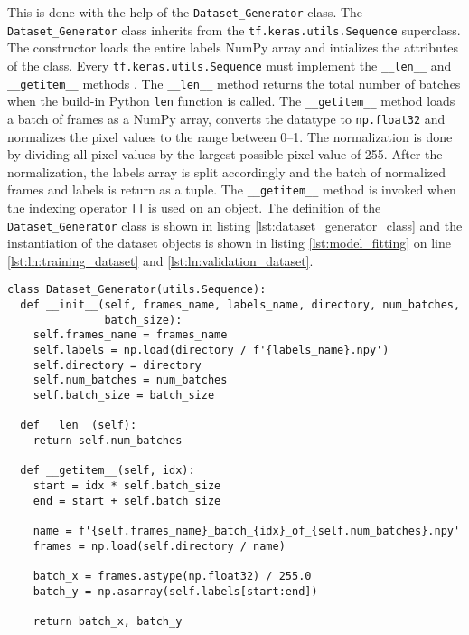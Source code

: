 This is done with the help of the \texttt{Dataset\_Generator} class.
The \texttt{Dataset\_Generator} class inherits from the \texttt{tf.keras.utils.Sequence} superclass.
The constructor loads the entire labels NumPy array and intializes the attributes of the class.
Every \texttt{tf.keras.utils.Sequence} must implement the \texttt{\_\_len\_\_} and \texttt{\_\_getitem\_\_} methods \cite{training_arch_tf_keras_sequence}.
The \texttt{\_\_len\_\_} method returns the total number of batches when the build-in Python \texttt{len} function is called.
The \texttt{\_\_getitem\_\_} method loads a batch of frames as a NumPy array, converts the datatype to \texttt{np.float32} and normalizes the pixel values to the range between \numrange{0}{1}.
The normalization is done by dividing all pixel values by the largest possible pixel value of \num{255}.
After the normalization, the labels array is split accordingly and the batch of normalized frames and labels is return as a tuple.
The \texttt{\_\_getitem\_\_} method is invoked when the indexing operator \texttt{[]} is used on an object.
The definition of the \texttt{Dataset\_Generator} class is shown in listing \ref{lst:dataset_generator_class} and the instantiation of the dataset objects is shown in listing \ref{lst:model_fitting} on line \ref{lst:ln:training_dataset} and \ref{lst:ln:validation_dataset}.

\begin{lstlisting}[style=python, caption={\texttt{Dataset\_Generator} class}, label=lst:dataset_generator_class]
class Dataset_Generator(utils.Sequence):
  def __init__(self, frames_name, labels_name, directory, num_batches,
               batch_size):
    self.frames_name = frames_name
    self.labels = np.load(directory / f'{labels_name}.npy')
    self.directory = directory
    self.num_batches = num_batches
    self.batch_size = batch_size

  def __len__(self):
    return self.num_batches

  def __getitem__(self, idx):
    start = idx * self.batch_size
    end = start + self.batch_size

    name = f'{self.frames_name}_batch_{idx}_of_{self.num_batches}.npy'
    frames = np.load(self.directory / name)

    batch_x = frames.astype(np.float32) / 255.0
    batch_y = np.asarray(self.labels[start:end])

    return batch_x, batch_y
\end{lstlisting}

